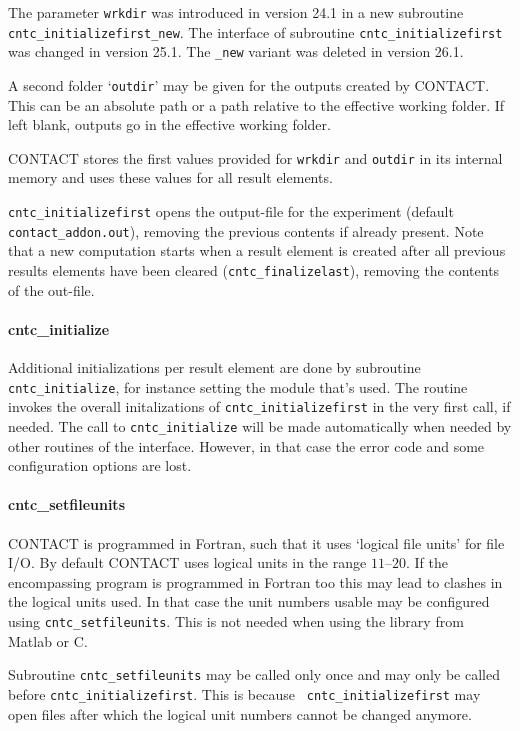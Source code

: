 \documentclass[12pt]{report}
\begin{document}
The parameter {\tt wrkdir} was introduced in version 24.1 in a new
subroutine {\tt cntc\_initialize\-first\-\_\-new}. The interface of
subroutine {\tt cntc\_initialize\-first} was changed in version 25.1.
The {\tt \_new} variant was deleted in version 26.1.

A second folder `{\tt outdir}' may be given for the outputs created by
CONTACT. This can be an absolute path or a path relative to the effective
working folder. If left blank, outputs go in the effective working
folder.

CONTACT stores the first values provided for {\tt wrkdir} and {\tt outdir}
in its internal memory and uses these values for all result elements.

{\tt cntc\_initializefirst} opens the output-file for the experiment
(default {\tt contact\_addon.out}), removing the previous contents if
already present. Note that a new computation starts when a result element
is created after all previous results elements have been cleared
({\tt cntc\_finalizelast}), removing the contents of the out-file.

\paragraph{cntc\_initialize}

Additional initializations per result element are done by subroutine {\tt
cntc\_\-init\-ial\-ize}, for instance setting the module that's used. The
routine invokes the overall initalizations of {\tt cntc\_initializefirst}
in the very first call, if needed. The call to {\tt cntc\_initialize} will
be made automatically when needed by other routines of the interface.
However, in that case the error code and some configuration options are
lost.

\paragraph{cntc\_setfileunits}

CONTACT is programmed in Fortran, such that it uses `logical file units'
for file I/O. By default CONTACT uses logical units in the range
$11\text{--}20$. If the encompassing program is programmed in Fortran too
this may lead to clashes in the logical units used. In that case the unit
numbers usable may be configured using {\tt cntc\_setfileunits}. This is
not needed when using the library from Matlab or C.

Subroutine {\tt cntc\_setfileunits} may be called only once and may only be
called before {\tt cntc\_\-init\-ia\-lize\-first}. This is because {\tt
cntc\_initializefirst} may open files after which the logical unit numbers
cannot be changed anymore.
\end{document}
